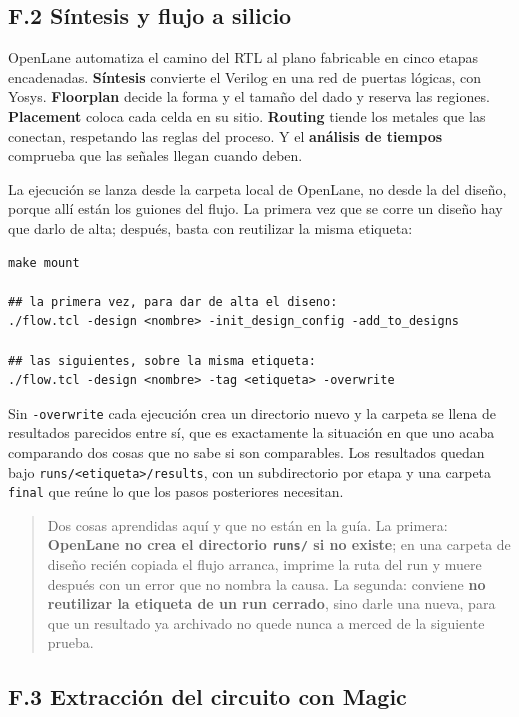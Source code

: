 \subsection{F.2 Síntesis y flujo a
silicio}\label{f.2-suxedntesis-y-flujo-a-silicio}

OpenLane automatiza el camino del RTL al plano fabricable en cinco
etapas encadenadas. \textbf{Síntesis} convierte el Verilog en una red de
puertas lógicas, con Yosys. \textbf{Floorplan} decide la forma y el
tamaño del dado y reserva las regiones. \textbf{Placement} coloca cada
celda en su sitio. \textbf{Routing} tiende los metales que las conectan,
respetando las reglas del proceso. Y el \textbf{análisis de tiempos}
comprueba que las señales llegan cuando deben.

La ejecución se lanza desde la carpeta local de OpenLane, no desde la
del diseño, porque allí están los guiones del flujo. La primera vez que
se corre un diseño hay que darlo de alta; después, basta con reutilizar
la misma etiqueta:

\begin{verbatim}
make mount

## la primera vez, para dar de alta el diseno:
./flow.tcl -design <nombre> -init_design_config -add_to_designs

## las siguientes, sobre la misma etiqueta:
./flow.tcl -design <nombre> -tag <etiqueta> -overwrite
\end{verbatim}

Sin \texttt{-overwrite} cada ejecución crea un directorio nuevo y la
carpeta se llena de resultados parecidos entre sí, que es exactamente la
situación en que uno acaba comparando dos cosas que no sabe si son
comparables. Los resultados quedan bajo
\texttt{runs/\textless{}etiqueta\textgreater{}/results}, con un
subdirectorio por etapa y una carpeta \texttt{final} que reúne lo que
los pasos posteriores necesitan.

\begin{quote}
Dos cosas aprendidas aquí y que no están en la guía. La primera:
\textbf{OpenLane no crea el directorio \texttt{runs/} si no existe}; en
una carpeta de diseño recién copiada el flujo arranca, imprime la ruta
del run y muere después con un error que no nombra la causa. La segunda:
conviene \textbf{no reutilizar la etiqueta de un run cerrado}, sino
darle una nueva, para que un resultado ya archivado no quede nunca a
merced de la siguiente prueba.
\end{quote}

\subsection{F.3 Extracción del circuito con
Magic}\label{f.3-extracciuxf3n-del-circuito-con-magic}

